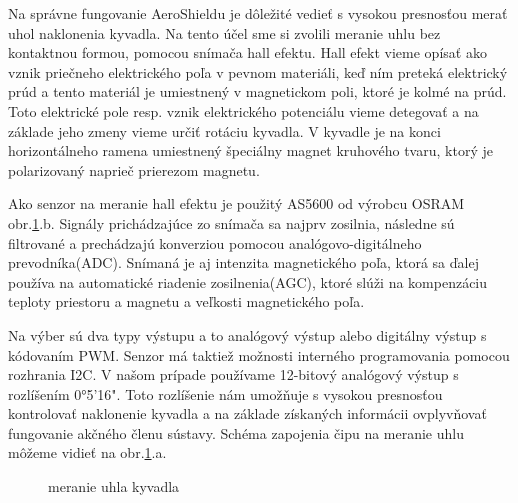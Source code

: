 Na správne fungovanie AeroShieldu je dôležité vedieť s vysokou presnosťou merať uhol naklonenia kyvadla. Na tento účel sme si zvolili meranie uhlu bez kontaktnou formou, pomocou snímača hall efektu. Hall efekt vieme opísať ako vznik priečneho elektrického poľa v pevnom materiáli, keď ním preteká elektrický prúd a tento materiál je umiestnený v magnetickom poli, ktoré je kolmé na prúd\cite{Hall}. Toto elektrické pole resp. vznik elektrického potenciálu vieme detegovať a na základe jeho zmeny vieme určiť rotáciu kyvadla. V kyvadle je na konci horizontálneho ramena umiestnený špeciálny magnet kruhového tvaru, ktorý je polarizovaný naprieč prierezom magnetu.

Ako senzor na meranie hall efektu je použitý AS5600 od výrobcu OSRAM obr.\ref{OBRAZOK 2.2}.b. Signály prichádzajúce zo snímača sa najprv zosilnia, následne sú filtrované a prechádzajú konverziou pomocou analógovo-digitálneho prevodníka(ADC). Snímaná je aj intenzita magnetického poľa, ktorá sa ďalej používa na
automatické riadenie zosilnenia(AGC), ktoré slúži na kompenzáciu teploty priestoru a magnetu a veľkosti magnetického poľa.

Na výber sú dva typy výstupu a to analógový výstup alebo digitálny výstup s kódovaním PWM. Senzor má taktiež možnosti interného programovania pomocou rozhrania I2C.
V našom prípade používame 12-bitový analógový výstup s rozlíšením 0°5'16". Toto rozlíšenie nám umožňuje s vysokou presnosťou kontrolovať naklonenie kyvadla a na základe získaných informácii ovplyvňovať fungovanie akčného členu sústavy. Schéma zapojenia čipu na meranie uhlu môžeme vidieť na obr.\ref{OBRAZOK 2.2}.a.



\begin{figure}[!tbh]
	\hfill
	\hfill
	\hfill
	\caption{meranie uhla kyvadla}\label{OBRAZOK 2.2}
\end{figure}

